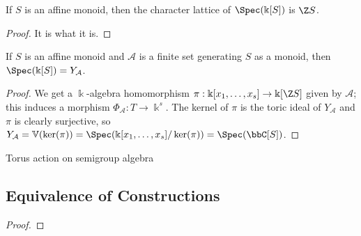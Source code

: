 \begin{proposition}
  \label{1-1-14-char-spec-aff-mon-alg}

  If $S$ is an affine monoid, then the character lattice of $\Spec(\Bbbk[S])$ is $\Z S$.
\end{proposition}
\begin{proof}
  \uses{}

  It is what it is.
\end{proof}


\begin{proposition}
  \label{1-1-14-spec-aff-mon-alg-eq-ya}

  If $S$ is an affine monoid and $\mathcal A$ is a finite set generating $S$ as a monoid, then $\Spec(\Bbbk[S]) = Y_{\mathcal A}$.
\end{proposition}
\begin{proof}

  We get a $\Bbbk$-algebra homomorphism $\pi : \Bbbk[x_1, \dotsc, x_s] \to \Bbbk[\Z S]$ given by $\mathcal A$; this induces a morphism $\Phi_{\mathcal A} : T \to \Bbbk^s$. The kernel of $\pi$ is the toric ideal of $Y_{\mathcal A}$ and $\pi$ is clearly surjective, so $Y_{\mathcal A} = \mathbb V(\ker(\pi)) = \Spec(\Bbbk[x_1, \dotsc, x_s] / \ker(\pi)) = \Spec(\bbC[S])$.
\end{proof}


\begin{definition}
  \label{torActOnAlg}
  Torus action on semigroup algebra
\end{definition}


\subsection{Equivalence of Constructions}


\begin{lemma}
  \label{lmm:1-1-16}
\end{lemma}
\begin{proof}

\end{proof}


